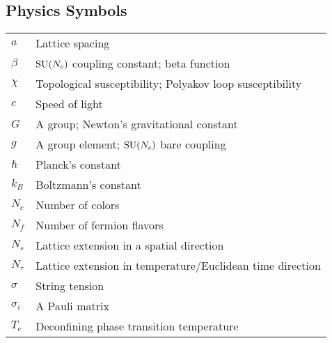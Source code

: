 \documentclass[12pt]{book}
\theoremstyle{definition}
\newenvironment{frontstuff}
  {\centering\chapter*{}}
  {\clearpage}
\begin{document}
\begin{frontstuff}
\section*{Physics Symbols}
\begin{tabular}{ll}
$a$             & Lattice spacing \\
$\beta$         & $\operatorname{SU}(N_c)$ coupling constant; beta function \\
$\chi$          & Topological susceptibility; Polyakov loop susceptibility\\
$c$             & Speed of light\\
$G$             & A group; Newton's gravitational constant\\
$g$             & A group element; $\operatorname{SU}(N_c)$ bare coupling\\
$\hbar$         & Planck's constant \\
$k_B$           & Boltzmann's constant \\
$N_c$           & Number of colors \\
$N_f$           & Number of fermion flavors \\
$N_s$           & Lattice extension in a spatial direction \\
$N_\tau$        & Lattice extension in temperature/Euclidean time direction\\
$\sigma$        & String tension\\
$\sigma_i$      & A Pauli matrix\\
$T_c$           & Deconfining phase transition temperature\\
\end{tabular}
\clearpage


\end{frontstuff}
\end{document}
